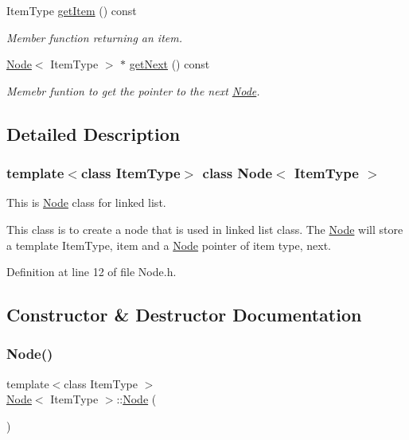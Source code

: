 \begin{DoxyCompactItemize}
Item\+Type \hyperlink{classNode_a6c08caef312b6f2f69b5e090cf047514}{get\+Item} () const
\begin{DoxyCompactList}\small\item\em Member function returning an item. \end{DoxyCompactList}\item 
\hyperlink{classNode}{Node}$<$ Item\+Type $>$ $\ast$ \hyperlink{classNode_a3eb0c96e03a3fd46ea1cff4c305bbedd}{get\+Next} () const
\begin{DoxyCompactList}\small\item\em Memebr funtion to get the pointer to the next \hyperlink{classNode}{Node}. \end{DoxyCompactList}\end{DoxyCompactItemize}


\subsection{Detailed Description}
\subsubsection*{template$<$class Item\+Type$>$\newline
class Node$<$ Item\+Type $>$}

This is \hyperlink{classNode}{Node} class for linked list. 

This class is to create a node that is used in linked list class. The \hyperlink{classNode}{Node} will store a template Item\+Type, item and a \hyperlink{classNode}{Node} pointer of item type, next. 

Definition at line 12 of file Node.\+h.



\subsection{Constructor \& Destructor Documentation}
\mbox{\label{classNode_a627e94f4fba0e73c546e0fb2a7266f36}} 
\subsubsection{\texorpdfstring{Node()}{Node()}\hspace{0.1cm}{\footnotesize\ttfamily [1/3]}}
{\footnotesize\ttfamily template$<$class Item\+Type $>$ \\
\hyperlink{classNode}{Node}$<$ Item\+Type $>$\+::\hyperlink{classNode}{Node} (\begin{DoxyParamCaption}{ }\end{DoxyParamCaption})}



